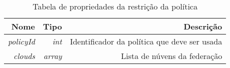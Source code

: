 \begin{table}[!htb]
    \centering
    \caption[Representação de otimização]{Tabela de propriedades da restrição da política
    \label{tab:optimization-shape}}
    \begin{tabular}{rrr}
        \toprule
            Nome & Tipo & Descrição \\ 
        \midrule
            \textit{policyId} & \textit{int} & Identificador da política que deve ser usada \\
            \textit{clouds} & \textit{array} & Lista de núvens da federação \\
        \bottomrule
    \end{tabular}
\end{table}

